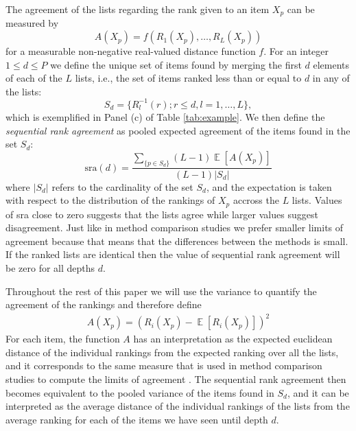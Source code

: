 \documentclass[12pt,a4paper]{article}
\DeclareMathOperator{\E}{\mathbb{E}}
\theoremstyle{plain}
\begin{document}
The agreement of the lists regarding the rank given to an item $X_p$ can be
measured by
\begin{equation}
  A(X_p) = f(R_1(X_p), \ldots, R_L(X_p))
\end{equation}
for a measurable non-negative real-valued distance function $f$.
For an integer $1\le d\le P$ we define the unique set of items found
by merging the first $d$ elements of each of the $L$ lists, i.e., the
set of items ranked less than or equal to $d$ in any of the lists:
\begin{equation}
S_d = \{R_l^{-1}(r) ; r \leq d, l = 1, \ldots, L \},
\end{equation}
which is exemplified in Panel (c) of Table \ref{tab:example}.
We then define the \emph{sequential rank agreement} as pooled expected agreement of the items
found in the set $S_d$:
\begin{equation}
\textrm{sra}(d)= \frac{\sum_{\{p \in S_d\}}(L-1)\E[A(X_p)]}{(L-1)|S_d|}\label{def:sra}
\end{equation}
where $|S_d|$ refers to the cardinality of the set $S_d$, and the expectation
is taken with respect to the distribution of the rankings of $X_p$ accross the $L$ lists.
Values of \textrm{sra} close to zero suggests that the lists agree while larger
values suggest disagreement. Just like in method comparison studies we
prefer smaller limits of agreement because that means that the
differences between the methods is small. If the ranked lists are
identical then the value of sequential rank agreement will be zero for
all depths $d$.


Throughout the rest of this paper we will use the variance to quantify the
agreement of the rankings and therefore define
\begin{align}
  A(X_p) = (R_i(X_p) -  \E[R_i(X_p)])^2
\end{align}
For each item, the function $A$ has an interpretation as the expected
euclidean distance of the individual rankings from the expected ranking over all the lists, and
it corresponds to the same measure that is used in method comparison studies to compute the
limits of agreement \citep{alt:bland:1983}. The sequential rank agreement then becomes equivalent
to the pooled variance of the items found in $S_d$, and it can be interpreted as
the average distance of the individual rankings of the lists from the
average ranking for each of the items we have seen until depth $d$.
\end{document}
